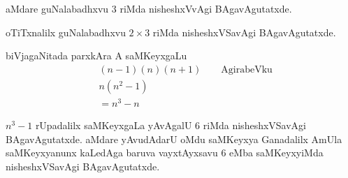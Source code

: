 aMdare guNalabadhxvu $3$ riMda nisheshxVvAgi BAgavAgutatxde.

oTiTxnalilx guNalabadhxvu $2\times 3$ riMda nisheshxVSavAgi BAgavAgutatxde.

biVjagaNitada parxkAra A saMKeyxgaLu
\begin{align*}
&(n-1)(n)(n+1)\qquad \text{AgirabeVku}\\
&n(n^2-1)\\
&=n^3-n
\end{align*}

$n^3-1$ rUpadalilx saMKeyxgaLa yAvAgalU $6$ riMda nisheshxVSavAgi BAgavAgutatxde. aMdare yAvudAdarU oMdu saMKeyxya Ganadalilx AmUla saMKeyxyanunx kaLedAga baruva vayxtAyxsavu $6$ eMba saMKeyxyiMda nisheshxVSavAgi BAgavAgutatxde.
